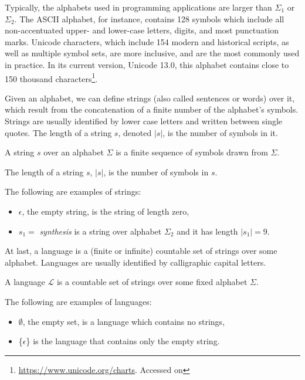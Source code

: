 Typically, the alphabets used in programming applications are larger than \(\Sigma_1\) or \(\Sigma_2\).
The ASCII alphabet, for instance, contains 128 symbols which include all non-accentuated upper- and lower-case letters, digits, and most punctuation marks.
Unicode characters, which include 154 modern and historical scripts, as well as multiple symbol sets, are more inclusive, and are the most commonly used in practice. In its current version, Unicode 13.0, this alphabet contains close to 150 thousand characters\footnote{\url{https://www.unicode.org/charts}. Accessed on }.

Given an alphabet, we can define strings (also called sentences or words) over it, which result from the concatenation of a finite number of the alphabet's symbols. Strings are usually identified by lower case letters and written between single quotes. The length of a string \(s\), denoted \(|s|\), is the number of symbols in it.

\begin{definition}[String]
A string \(s\) over an alphabet \(\Sigma\) is a finite sequence of symbols drawn from \(\Sigma\).
\end{definition}

\begin{definition}
The length of a string \(s\), \(|s|\), is the number of symbols in \(s\).
\end{definition}

\begin{example}
The following are examples of strings:
\begin{itemize}
\item \(\epsilon\), the empty string, is the string of length zero,\par
\item \(s_1 = \) \textit{synthesis} is a string over alphabet \(\Sigma_2\) and it has length \(|s_1| = 9\).
\end{itemize}
\end{example}

At last, a language is a (finite or infinite) countable set of strings over some alphabet. Languages are usually identified by calligraphic capital letters.

\begin{definition}[Language]
A language \(\mathcal{L}\) is a countable set of strings over some fixed alphabet \(\Sigma\).
\end{definition}

\begin{example}
The following are examples of languages:
\begin{itemize}
\item \(\emptyset\), the empty set, is a language which contains no strings,\par
\item \{\(\epsilon\)\} is the language that contains only the empty string.
\end{itemize}
\end{example}

